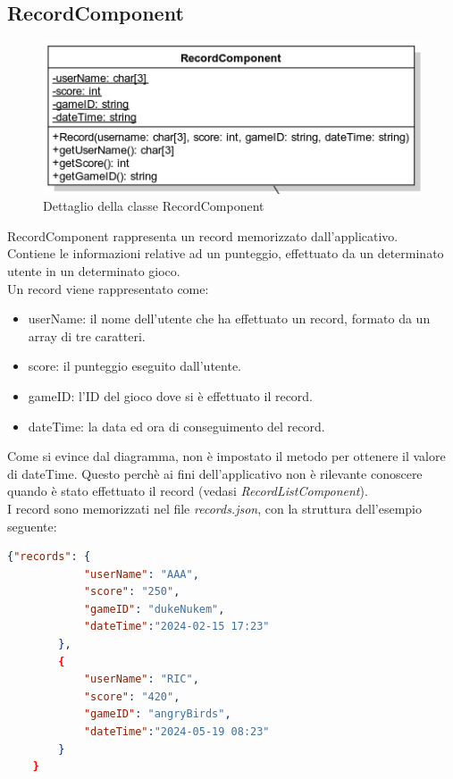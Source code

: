 \subsection{RecordComponent}
\begin{figure}[h]
    \centering
    \includegraphics[width=340pt]{ProgettazioneTecnica/Record.png}
    \caption{Dettaglio della classe RecordComponent}
    \label{fig:recordComponent}
\end{figure}
RecordComponent rappresenta un record memorizzato dall'applicativo.\\ Contiene le informazioni relative ad un punteggio, effettuato da un determinato utente in un determinato gioco.\\
Un record viene rappresentato come:
\begin{itemize}
    \item userName: il nome dell'utente che ha effettuato un record, formato da un array di tre caratteri.
    \item score: il punteggio eseguito dall'utente.
    \item gameID: l'ID del gioco dove si è effettuato il record.
    \item dateTime: la data ed ora di conseguimento del record.
\end{itemize}
Come si evince dal diagramma, non è impostato il metodo per ottenere il valore di dateTime. Questo perchè ai fini dell'applicativo non è rilevante conoscere quando è stato effettuato il record (vedasi \emph{RecordListComponent}).\\
I record sono memorizzati nel file \emph{records.json}, con la struttura dell'esempio seguente:
\begin{lstlisting}[language=json,firstnumber=1]
    {"records": {
            "userName": "AAA",
            "score": "250",
            "gameID": "dukeNukem",
            "dateTime":"2024-02-15 17:23"
        },
        {
            "userName": "RIC",
            "score": "420",
            "gameID": "angryBirds",
            "dateTime":"2024-05-19 08:23"
        }
    }
\end{lstlisting}
